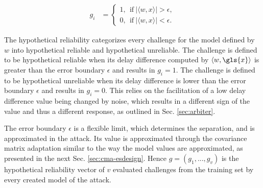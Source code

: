 \begin{equation}
\begin{aligned}
g_i &=
\begin{cases}
1,\ \ \text{if}\ |\langle w, x \rangle| > \epsilon,\\
0,\ \ \text{if}\ |\langle w, x \rangle| < \epsilon. \label{equ:hypotheticalreliability}
\end{cases}
\end{aligned}
\end{equation}

The hypothetical reliability categorizes every challenge for the model defined by $w$ into hypothetical reliable and hypothetical unreliable. %
The challenge is defined to be hypothetical reliable when its delay difference computed by $\langle w, \gls{x} \rangle$ is greater than the error boundary $\epsilon$ and results in $g_i = 1$.
The challenge is defined to be hypothetical unreliable when its delay difference is lower than the error boundary $\epsilon$ and results in $g_i = 0$. %
This relies on the facilitation of a low delay difference value being changed by noise, which results in a different sign of the value and thus a different response, as outlined in Sec. \ref{sec:arbiter}. 

The error boundary $\epsilon$ is a flexible limit, which determines the separation, and is approximated in the attack.
Its value is approximated through the covariance matrix adaptation similar to the way the model values are approximated, as presented in the next Sec. \ref{sec:cma-esdesign}.
Hence $g = (g_1, ..., g_v)$ is the hypothetical reliability vector of $v$ evaluated challenges from the training set by every created model of the attack.

